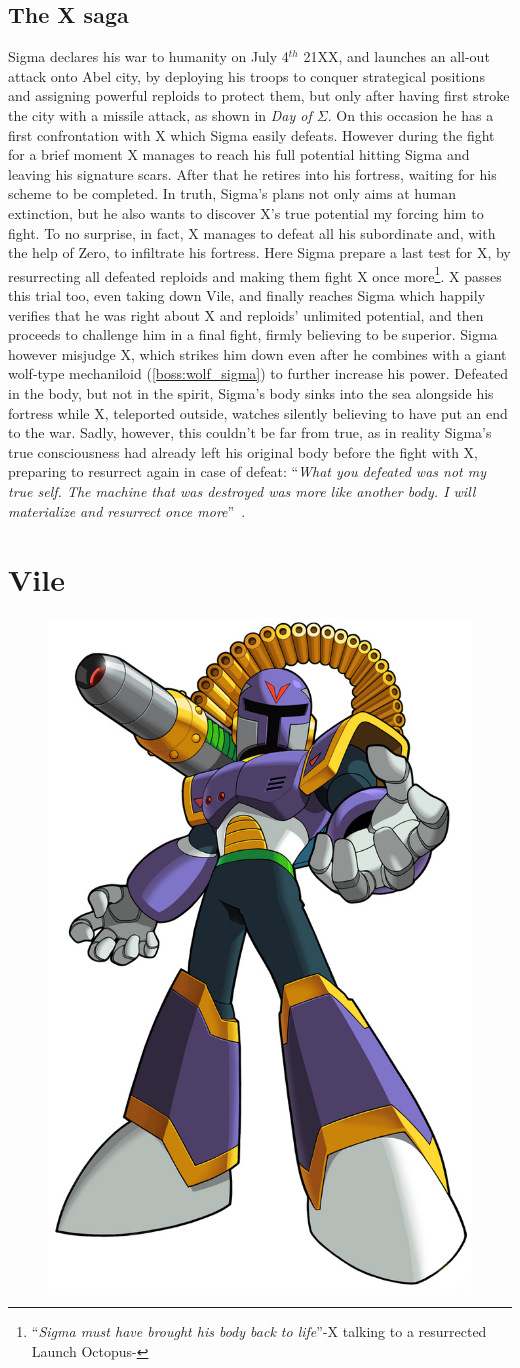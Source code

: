 \section{The X saga}
Sigma declares his war to humanity on July 4$^{th}$ 21XX, and launches an all-out attack onto Abel city, by deploying his troops to conquer strategical positions and assigning powerful reploids to protect them, but only after having first stroke the city  with a missile attack, as shown in \textit{Day of $\Sigma$}. On this occasion he has a first confrontation with X which Sigma easily defeats. However during the fight for a brief moment X manages to reach his full potential hitting Sigma and leaving his signature scars. After that he retires
into his fortress, waiting for his scheme to be completed. In truth, Sigma's plans not only aims at human extinction, but he also wants to discover X's true potential my forcing him to fight. To no surprise, in fact, X manages to defeat all his subordinate and, with the help of Zero, to infiltrate his fortress. Here Sigma prepare a last test for X, by resurrecting all defeated reploids and making them fight X once more\footnote{``\textit{Sigma must have brought his body back to life}''-X talking to a resurrected Launch Octopus-\cite{wiki:MM_MHX_script}}. X passes this trial too, even taking down Vile, and finally reaches Sigma which happily verifies that he was right about X and reploids' unlimited potential, and then proceeds to challenge him in a final fight, firmly believing to be superior. Sigma however misjudge X, which strikes him down even after he combines with a giant wolf-type mechaniloid (\ref{boss:wolf_sigma}) to further increase his power. Defeated in the body, but not in the spirit, Sigma's body sinks into the sea alongside his fortress while X, teleported outside, watches silently believing to have put an end to the war. Sadly, however, this couldn't be far from true, as in reality Sigma's true consciousness had already left his original body before the fight with X, preparing to resurrect again in case of defeat: ``\textit{What you defeated was not my true self. The machine that was destroyed was more like another body. I will materialize and resurrect once more}''~\cite{wordpress:X_japanese_script}.

\chapter{Vile}\label{char:Vile}
\begin{figure}[h]
	\centering
	\includegraphics[width=0.3\linewidth]{figures/X1/Sigma_stages/MhxVile.png}	
\end{figure}

